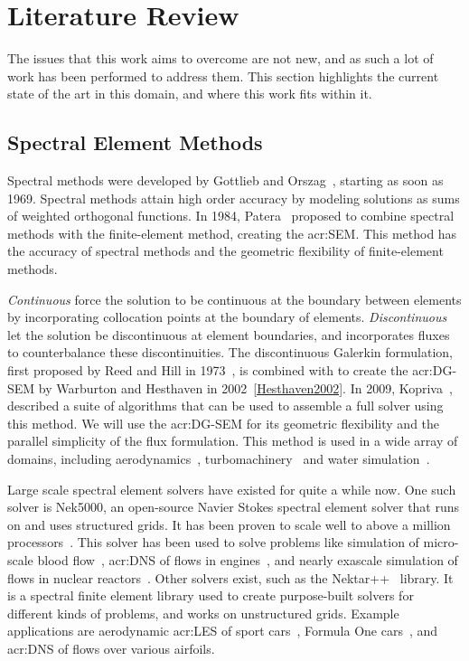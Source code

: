 \chapter{Literature Review}\label{chapter:literature_review} 

The issues that this work aims to overcome are not new, and as such a lot of work has been performed
to address them. This section highlights the current state of the art in this domain, and where this
work fits within it.

\section{Spectral Element Methods}\label{section:literature_review:sem}

Spectral methods were developed by Gottlieb and Orszag~\cite{Gottlieb1977}, starting as soon as
1969. Spectral methods attain high order accuracy by modeling solutions as sums of weighted
orthogonal functions. In 1984, Patera~\cite{Patera1984} proposed to combine spectral methods with
the finite-element method, creating the \acrfull{acr:SEM}. This method has the accuracy of spectral
methods and the geometric flexibility of finite-element methods.

\textit{Continuous}  force the solution to be continuous at the boundary between
elements by incorporating collocation points at the boundary of elements. \textit{Discontinuous}
 let the solution be discontinuous at element boundaries, and incorporates fluxes
to counterbalance these discontinuities. The discontinuous Galerkin formulation, first proposed by
Reed and Hill in 1973~\cite{Reed1973}, is combined with  to create the
\acrfull{acr:DG-SEM} by Warburton and Hesthaven in 2002~\ref{Hesthaven2002}. In 2009,
Kopriva~\cite{Kopriva2009}, described a suite of algorithms that can be used to assemble a full
solver using this method. We will use the \acrshort{acr:DG-SEM} for its geometric flexibility and
the parallel simplicity of the flux formulation. This method is used in a wide array of domains,
including aerodynamics~\cite{Beck2014}, turbomachinery~\cite{Garai2015} and water
simulation~\cite{Gassner2016}.

Large scale spectral element solvers have existed for quite a while now. One such solver is Nek5000,
an open-source Navier Stokes spectral element solver that runs on  and uses
structured grids. It has been proven to scale well to above a million
processors~\cite{Offermans2017}. This solver has been used to solve problems like simulation of
micro-scale blood flow~\cite{Obabko2017}, \acrfull{acr:DNS} of flows in engines~\cite{Ameen2020},
and nearly exascale simulation of flows in nuclear reactors~\cite{Merzari2020}. Other solvers exist,
such as the Nektar++~\cite{Cantwell2015} library. It is a spectral finite element library used to
create purpose-built solvers for different kinds of problems, and works on unstructured grids.
Example applications are aerodynamic \acrfull{acr:LES} of sport cars~\cite{Mengaldo2020}, Formula
One cars~\cite{Cantwell2015}, and \acrshort{acr:DNS} of flows over various airfoils.

